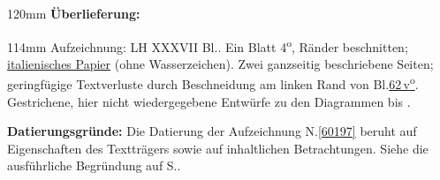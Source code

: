 %
\frenchspacing%
\begin{ledgroupsized}[r]{120mm}%
\footnotesize%
\pstart%
\noindent\textbf{Überlieferung:}%
\pend%
\end{ledgroupsized}%
\begin{ledgroupsized}[r]{114mm}%
\footnotesize%
\pstart%
\parindent -6mm%
%
Aufzeichnung:
LH XXXVII Bl..
Ein Blatt 4\textsuperscript{o},
Ränder beschnitten;
\href{\Scan{LH_37_03_062wz}}{italienisches Papier} (ohne Wasserzeichen).
Zwei ganzseitig beschriebene Seiten;
geringfügige Textverluste durch Beschneidung am linken Rand von Bl.\;\href{\Scan{LH_37_03_062v}}{62\,v\textsuperscript{o}}.
Gestrichene, hier nicht wiedergegebene Entwürfe zu den Diagrammen  %
bis .
\pend%
\end{ledgroupsized}%
\vspace{5mm}%
\begin{ledgroup}%
\footnotesize%
\pstart%
\noindent%
\textbf{Datierungsgründe:}
Die Datierung der Aufzeichnung N.\;\ref{60197} beruht auf Eigenschaften des Textträgers sowie auf inhaltlichen Betrachtungen.
Siehe die ausführliche Begründung auf S.\;\pageref{60197_dat}.%
\pend%
\end{ledgroup}%
%
\frenchspacing%
\vspace{6mm}%
\normalsize%
\pstart%
\noindent%
\centering%
%
\hfill%
%
\pend%
\vspace{0.5em}%
\pstart%
\noindent%
